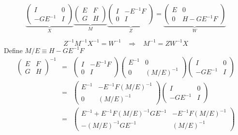 \documentclass{article}
\begin{document}
\begin{equation*}
\underbrace{\begin{pmatrix} I & 0 \\ -G E^{-1} & I \end{pmatrix}}_{X} \underbrace{\begin{pmatrix}  E & F \\ G & H \end{pmatrix}}_{M} \underbrace{\begin{pmatrix} I & -E^{-1}F \\ 0 & I \end{pmatrix}}_{Z} = \underbrace{\begin{pmatrix} E & 0 \\ 0 & H - G E^{-1} F \end{pmatrix}}_{W}
\end{equation*}

\begin{equation*}
Z^{-1} M^{-1} X^{-1} = W^{-1}   \hspace{10pt} \Rightarrow \hspace{10pt} M^{-1} = Z W^{-1} X
\end{equation*}
\newline
Define $M/E \equiv H - G E^{-1} F$
\newline
\begin{eqnarray*}
\begin{pmatrix}  E & F \\ G & H \end{pmatrix}^{-1} & =& \begin{pmatrix} I & -E^{-1}F \\ 0 & I \end{pmatrix}  \begin{pmatrix} E^{-1} & 0 \\ 0 & (M/E)^{-1} \end{pmatrix} \begin{pmatrix} I & 0 \\ -G E^{-1} & I \end{pmatrix} \\
&=& \begin{pmatrix} E^{-1} & -E^{-1}F (M/E)^{-1} \\ 0 & (M/E)^{-1} \end{pmatrix}  \begin{pmatrix} I & 0 \\ -G E^{-1} & I \end{pmatrix} \\
&=& \begin{pmatrix} E^{-1} + E^{-1} F (M/E)^{-1} G E^{-1} & -E^{-1} F (M/E)^{-1} \\ -(M/E)^{-1} G E^{-1} & (M/E)^{-1} \end{pmatrix}
\end{eqnarray*}
\end{document}
